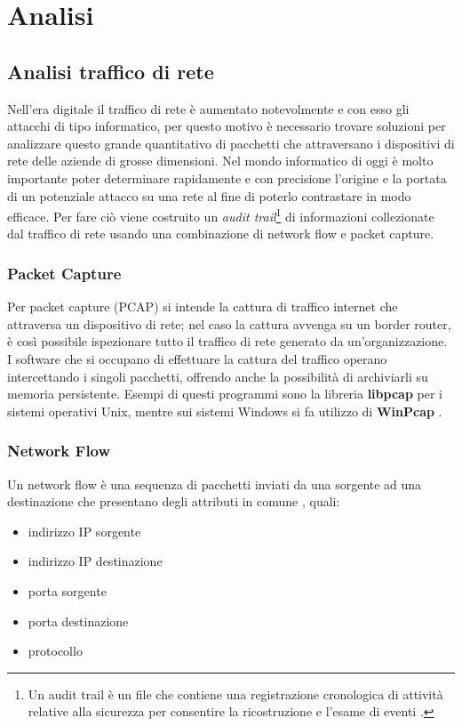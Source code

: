 \documentclass[../main.tex]{subfiles}
\begin{document}
\chapter{Analisi} 

\section{Analisi traffico di rete}

Nell'era digitale il traffico di rete è aumentato notevolmente e con esso gli attacchi di tipo informatico, per questo motivo è necessario trovare soluzioni per analizzare questo grande quantitativo di pacchetti che attraversano i dispositivi di rete delle aziende di grosse dimensioni. Nel mondo informatico di oggi è molto importante poter determinare rapidamente e con precisione l'origine e la portata di un potenziale attacco su una rete al fine di poterlo contrastare in modo efficace.
Per fare ciò viene costruito un \textit{audit trail}\footnote{Un audit trail è un file che contiene una registrazione cronologica di attività relative alla sicurezza per consentire la ricostruzione e l'esame di eventi \cite{auditTrail}.
} di informazioni collezionate dal traffico di rete usando una combinazione di network flow e packet capture.


\subsection{Packet Capture}
Per packet capture (PCAP) si intende la cattura di traffico internet che attraversa un dispositivo di rete; nel caso la cattura avvenga su un border router, è così possibile ispezionare tutto il traffico di rete generato da un'organizzazione. I software che si occupano di effettuare la cattura del traffico operano intercettando i singoli pacchetti, offrendo anche la possibilità di archiviarli su memoria persistente. Esempi di questi programmi sono la libreria \textbf{libpcap} per i sistemi operativi Unix, mentre sui sistemi Windows si fa utilizzo di \textbf{WinPcap} \cite{pcap}.

\subsection{Network Flow}
Un network flow è una sequenza di pacchetti inviati da una sorgente ad una destinazione che presentano degli attributi in comune \cite{trafficflow}, quali:
\begin{itemize}
				\item indirizzo IP sorgente
				\item indirizzo IP destinazione
				\item porta sorgente
				\item porta destinazione
				\item protocollo
\end{itemize}
\end{document}
